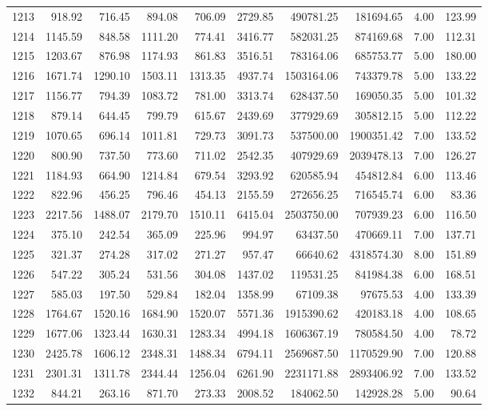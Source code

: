 \begin{tabular}{lrrrrrrrrr}
1213 & 918.92 & 716.45 & 894.08 & 706.09 & 2729.85 & 490781.25 & 181694.65 & 4.00 & 123.99 \\
1214 & 1145.59 & 848.58 & 1111.20 & 774.41 & 3416.77 & 582031.25 & 874169.68 & 7.00 & 112.31 \\
1215 & 1203.67 & 876.98 & 1174.93 & 861.83 & 3516.51 & 783164.06 & 685753.77 & 5.00 & 180.00 \\
1216 & 1671.74 & 1290.10 & 1503.11 & 1313.35 & 4937.74 & 1503164.06 & 743379.78 & 5.00 & 133.22 \\
1217 & 1156.77 & 794.39 & 1083.72 & 781.00 & 3313.74 & 628437.50 & 169050.35 & 5.00 & 101.32 \\
1218 & 879.14 & 644.45 & 799.79 & 615.67 & 2439.69 & 377929.69 & 305812.15 & 5.00 & 112.22 \\
1219 & 1070.65 & 696.14 & 1011.81 & 729.73 & 3091.73 & 537500.00 & 1900351.42 & 7.00 & 133.52 \\
1220 & 800.90 & 737.50 & 773.60 & 711.02 & 2542.35 & 407929.69 & 2039478.13 & 7.00 & 126.27 \\
1221 & 1184.93 & 664.90 & 1214.84 & 679.54 & 3293.92 & 620585.94 & 454812.84 & 6.00 & 113.46 \\
1222 & 822.96 & 456.25 & 796.46 & 454.13 & 2155.59 & 272656.25 & 716545.74 & 6.00 & 83.36 \\
1223 & 2217.56 & 1488.07 & 2179.70 & 1510.11 & 6415.04 & 2503750.00 & 707939.23 & 6.00 & 116.50 \\
1224 & 375.10 & 242.54 & 365.09 & 225.96 & 994.97 & 63437.50 & 470669.11 & 7.00 & 137.71 \\
1225 & 321.37 & 274.28 & 317.02 & 271.27 & 957.47 & 66640.62 & 4318574.30 & 8.00 & 151.89 \\
1226 & 547.22 & 305.24 & 531.56 & 304.08 & 1437.02 & 119531.25 & 841984.38 & 6.00 & 168.51 \\
1227 & 585.03 & 197.50 & 529.84 & 182.04 & 1358.99 & 67109.38 & 97675.53 & 4.00 & 133.39 \\
1228 & 1764.67 & 1520.16 & 1684.90 & 1520.07 & 5571.36 & 1915390.62 & 420183.18 & 4.00 & 108.65 \\
1229 & 1677.06 & 1323.44 & 1630.31 & 1283.34 & 4994.18 & 1606367.19 & 780584.50 & 4.00 & 78.72 \\
1230 & 2425.78 & 1606.12 & 2348.31 & 1488.34 & 6794.11 & 2569687.50 & 1170529.90 & 7.00 & 120.88 \\
1231 & 2301.31 & 1311.78 & 2344.44 & 1256.04 & 6261.90 & 2231171.88 & 2893406.92 & 7.00 & 133.52 \\
1232 & 844.21 & 263.16 & 871.70 & 273.33 & 2008.52 & 184062.50 & 142928.28 & 5.00 & 90.64 \\

\end{tabular}
